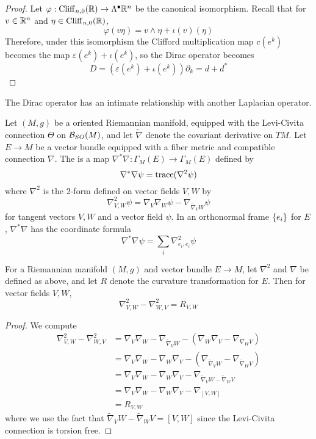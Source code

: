 %
\begin{proof}
Let $\varphi : \operatorname{Cliff}_{n,0}(\mathbb{R}) \to \Lambda^\bullet \mathbb{R}^n$ be the canonical isomorphism.
Recall that for $v \in \mathbb{R}^n$ and $\eta \in \operatorname{Cliff}_{n,0}(\mathbb{R})$,
\[
\varphi(v\eta) = v \wedge \eta + \iota(v)(\eta)
\]
Therefore, under this isomorphism the Clifford multiplication map $c(e^k)$ becomes
the map $\varepsilon(e^k) + \iota(e^k)$, so the Dirac operator becomes
\[
D = (\varepsilon(e^k) + \iota(e^k))\partial_k = d + d^*
\]
\end{proof}
%
The Dirac operator has an intimate relationship with another Laplacian operator.
\begin{defn}
Let $(M,g)$ be a oriented Riemannian manifold, equipped with the Levi-Civita connection
$\Theta$ on $\mathcal{B}_{SO}(M)$, and let $\widetilde{\nabla}$ denote the covariant derivative
on $TM$. Let $E \to M$ be a vector bundle equipped with a fiber metric and compatible
connection $\nabla$. The  is a map
$\nabla^*\nabla : \Gamma_M(E) \to \Gamma_M(E)$ defined by
\[
\nabla^*\nabla\psi = \operatorname{trace}(\nabla^2\psi)
\]
where $\nabla^2$ is the $2$-form defined on vector fields $V,W$ by
\[
\nabla^2_{V,W}\psi = \nabla_V\nabla_W\psi - \nabla_{\widetilde{\nabla}_VW}\psi
\]
for tangent vectors $V,W$ and a vector field $\psi$. In an orthonormal frame $\left\lbrace e_i \right\rbrace$
for $E$, $\nabla^*\nabla$ has the coordinate formula
\[
\nabla^*\nabla\psi = \sum_i \nabla^2_{e_i, e_i}\psi
\]
\end{defn}
%
\begin{lem}
For a Riemannian manifold $(M,g)$ and vector bundle $E \to M$, let $\nabla^2$  and
$\nabla$ be defined as above, and let $R$ denote the curvature transformation for $E$.
Then for vector fields $V,W$,
\[
\nabla^2_{V,W} - \nabla^2_{W,V} = R_{V,W}
\]
\end{lem}
%
\begin{proof}
We compute
\begin{align*}
\nabla^2_{V,W} - \nabla^2_{W,V} &= \nabla_V\nabla_W - \nabla_{\widetilde{\nabla}_VW}
- (\nabla_W\nabla_V - \nabla_{\nabla_W V}) \\
&= \nabla_V\nabla_W - \nabla_W\nabla_V - (\nabla_{\widetilde{\nabla}_VW}
- \nabla_{\widetilde{\nabla}_WV}) \\
&= \nabla_V\nabla_W - \nabla_W\nabla_V - \nabla_{\widetilde{\nabla}_VW
- \widetilde{\nabla}_WV} \\
&= \nabla_V\nabla_W - \nabla_W\nabla_V - \nabla_{[V,W]} \\
&= R_{V,W}
\end{align*}
where we use the fact that $\widetilde{\nabla}_VW - \widetilde{\nabla}_WV = [V,W]$ since
the Levi-Civita connection is torsion free.
\end{proof}
